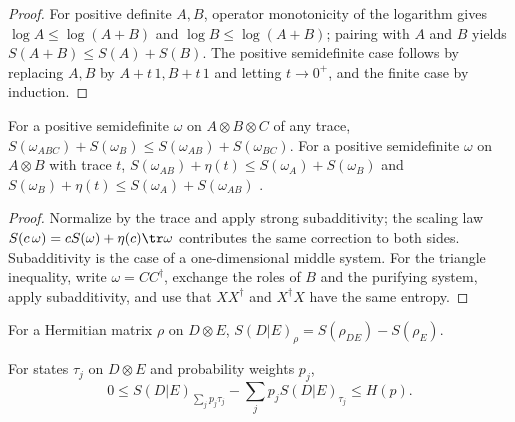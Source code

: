\begin{proof}\leanok
    For positive definite $A,B$, operator monotonicity of the logarithm gives
    $\log A\le\log(A+B)$ and $\log B\le\log(A+B)$; pairing with $A$ and $B$
    yields $S(A+B)\le S(A)+S(B)$. The positive semidefinite case follows by
    replacing $A,B$ by $A+t\,1,B+t\,1$ and letting $t\to0^+$, and the finite
    case by induction.
\end{proof}

\begin{theorem}
    \label{thm:ssa_unnormalized}
    \leanok
    For a positive semidefinite $\omega$ on $A\otimes B\otimes C$ of any trace,
    $S(\omega_{ABC})+S(\omega_B)\le S(\omega_{AB})+S(\omega_{BC})$. For a
    positive semidefinite $\omega$ on $A\otimes B$ with trace $t$,
    $S(\omega_{AB})+\eta(t)\le S(\omega_A)+S(\omega_B)$ and
    $S(\omega_B)+\eta(t)\le S(\omega_A)+S(\omega_{AB})$
    \cite{ArakiLieb1970Entropy}.
\end{theorem}

\begin{proof}\leanok
    Normalize by the trace and apply strong subadditivity; the scaling law
    $S(c\,\omega)=cS(\omega)+\eta(c)\tr\omega$ contributes the same correction
    to both sides. Subadditivity is the case of a one-dimensional middle
    system. For the triangle inequality, write $\omega=CC^\dagger$, exchange
    the roles of $B$ and the purifying system, apply subadditivity, and use
    that $XX^\dagger$ and $X^\dagger X$ have the same entropy.
\end{proof}

\begin{definition}\label{def:conditional_entropy}
    \leanok
    For a Hermitian matrix $\rho$ on $D\otimes E$,
    $S(D|E)_\rho=S(\rho_{DE})-S(\rho_E)$.
\end{definition}

\begin{lemma}
    \label{lem:conditional_entropy_mixture}
    \leanok
    For states $\tau_j$ on $D\otimes E$ and probability weights $p_j$,
    \[
      0\le S(D|E)_{\sum_jp_j\tau_j}-\sum_jp_jS(D|E)_{\tau_j}\le H(p).
    \]
\end{lemma}

